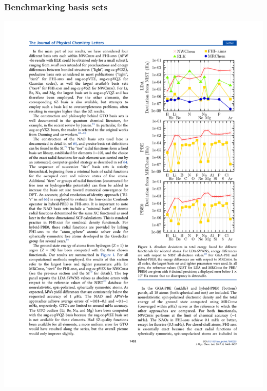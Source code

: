\begin{frame}
    \frametitle{Benchmarking basis sets}
    \begin{center}
	\includegraphics[scale=1.00, clip, viewport = 300 615 550 784]{figures/elephant_atoms.pdf}
    \end{center}
\end{frame}

